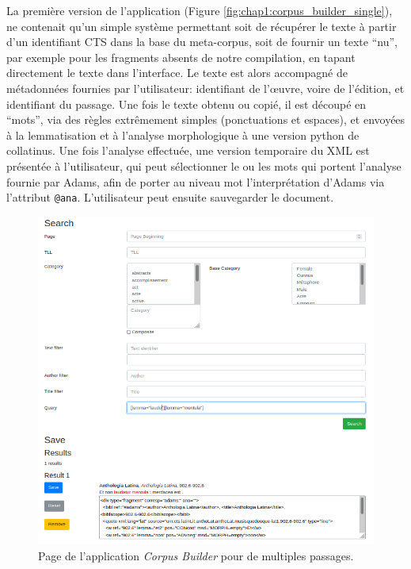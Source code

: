 La première version de l'application (Figure \ref{fig:chap1:corpus_builder_single}), ne contenait qu'un simple système permettant soit de récupérer le texte à partir d'un identifiant CTS dans la base du meta-corpus, soit de fournir un texte \enquote{nu}, par exemple pour les fragments absents de notre compilation, en tapant directement le texte dans l'interface. Le texte est alors accompagné de métadonnées fournies par l'utilisateur: identifiant de l'œuvre, voire de l'édition, et identifiant du passage. Une fois le texte obtenu ou copié, il est découpé en \enquote{mots}, via des règles extrêmement simples (ponctuations et espaces), et envoyées à la lemmatisation et à l'analyse morphologique à une version python de collatinus. Une fois l'analyse effectuée, une version temporaire du XML est présentée à l'utilisateur, qui peut sélectionner le ou les mots qui portent l'analyse fournie par Adams, afin de porter au niveau mot l'interprétation d'Adams via l'attribut \texttt{@ana}. L'utilisateur peut ensuite sauvegarder le document.

\begin{figure}
    \centering
    \includegraphics[width=\textwidth]{figures/chap1/part3/exemplier/corpus_builder_multiple.png}
    \caption{Page de l'application \textit{Corpus Builder} pour de multiples passages.}
    \label{fig:chap1:corpus_builder_mult}
\end{figure}

